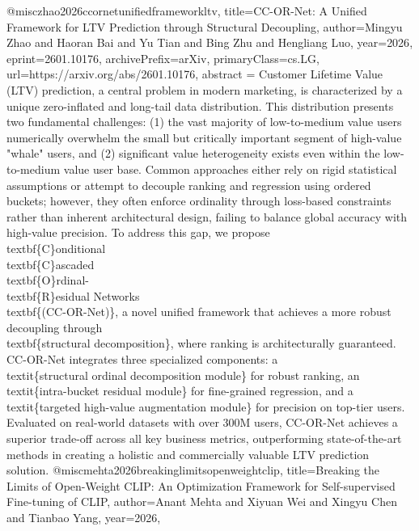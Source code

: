 {}@misc{zhao2026ccornetunifiedframeworkltv,
      title={CC-OR-Net: A Unified Framework for LTV Prediction through Structural Decoupling}, 
      author={Mingyu Zhao and Haoran Bai and Yu Tian and Bing Zhu and Hengliang Luo},
      year={2026},
      eprint={2601.10176},
      archivePrefix={arXiv},
      primaryClass={cs.LG},
      url={https://arxiv.org/abs/2601.10176},
      abstract = {Customer Lifetime Value (LTV) prediction, a central problem in modern marketing, is characterized by a unique zero-inflated and long-tail data distribution. This distribution presents two fundamental challenges: (1) the vast majority of low-to-medium value users numerically overwhelm the small but critically important segment of high-value "whale" users, and (2) significant value heterogeneity exists even within the low-to-medium value user base. Common approaches either rely on rigid statistical assumptions or attempt to decouple ranking and regression using ordered buckets; however, they often enforce ordinality through loss-based constraints rather than inherent architectural design, failing to balance global accuracy with high-value precision. To address this gap, we propose \\textbf\{C\}onditional \\textbf\{C\}ascaded \\textbf\{O\}rdinal-\\textbf\{R\}esidual Networks \\textbf\{(CC-OR-Net)\}, a novel unified framework that achieves a more robust decoupling through \\textbf\{structural decomposition\}, where ranking is architecturally guaranteed. CC-OR-Net integrates three specialized components: a \\textit\{structural ordinal decomposition module\} for robust ranking, an \\textit\{intra-bucket residual module\} for fine-grained regression, and a \\textit\{targeted high-value augmentation module\} for precision on top-tier users. Evaluated on real-world datasets with over 300M users, CC-OR-Net achieves a superior trade-off across all key business metrics, outperforming state-of-the-art methods in creating a holistic and commercially valuable LTV prediction solution.}
}@misc{mehta2026breakinglimitsopenweightclip,
      title={Breaking the Limits of Open-Weight CLIP: An Optimization Framework for Self-supervised Fine-tuning of CLIP}, 
      author={Anant Mehta and Xiyuan Wei and Xingyu Chen and Tianbao Yang},
      year={2026},
}

